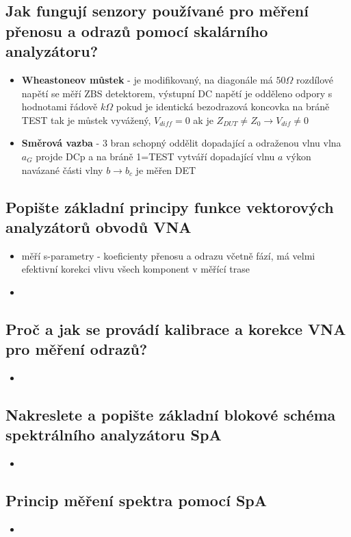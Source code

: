 \documentclass[a4paper]{article}
\begin{document}
\subsection{\textbf{Jak fungují senzory používané pro měření přenosu a odrazů pomocí skalárního analyzátoru? }}
\begin{itemize}
	\item \textbf{Wheastoneov můstek} - je modifikovaný, na diagonále má $50 \Omega$
	\subitem rozdílové napětí se měří ZBS detektorem, výstupní DC napětí je odděleno odpory s hodnotami řádově $k\Omega$
	\subitem pokud je identická bezodrazová koncovka na bráně TEST tak je můstek vyvážený, $V_{diff}=0$
	\subitem ak je $Z_{DUT}\neq Z_0 \to V_{dif}\neq 0$
	\item \textbf{Směrová vazba} - 3 bran schopný oddělit dopadající a odraženou vlnu
	\subitem vlna $a_G$ projde DCp a na bráně 1=TEST vytváří dopadající vlnu $a$
	\subitem výkon navázané části vlny $b \to b_c$ je měřen DET
\end{itemize}
\subsection{\textbf{Popište základní principy funkce vektorových analyzátorů obvodů VNA}}
\begin{itemize}
	\item měří s-parametry - koeficienty přenosu a odrazu včetně fází, má velmi efektivní korekci vlivu všech komponent v měřící trase
	\item
\end{itemize}
\subsection{\textbf{Proč a jak se provádí kalibrace a korekce VNA pro měření odrazů?}}
\begin{itemize}
	\item
\end{itemize}
\subsection{\textbf{Nakreslete a popište základní blokové schéma spektrálního analyzátoru SpA}}
\begin{itemize}
	\item
\end{itemize}
\subsection{\textbf{Princip měření spektra pomocí SpA}}
\begin{itemize}
	\item
\end{itemize}
\end{document}
